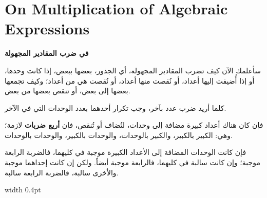 \documentclass[11pt,a4paper,openany,oneside]{book}
\begin{document}
\newpage

\chapter{On Multiplication of Algebraic Expressions}
\label{ch:multiplication}

\noindent\begin{minipage}[t]{0.48\textwidth}
\raggedleft

\begin{Arabic}
\textbf{في ضرب المقادير المجهولة}

سأعلمك الآن كيف تضرب المقادير المجهولة، أي الجذور، بعضها ببعض، إذا كانت وحدها، أو إذا أُضيفت إليها أعداد، أو نُقصت منها أعداد، أو نُقصت هي من أعداد؛ وكيف تجمعها بعضها إلى بعض، أو تنقص بعضها من بعض.

كلما أريد ضرب عدد بآخر، وجب تكرار أحدهما بعدد الوحدات التي في الآخر.

فإن كان هناك أعداد كبيرة مضافة إلى وحدات، لتُضاف أو تُنقص، فإن \textbf{أربع ضربات} لازمة؛ وهي: الكبير بالكبير، والكبير بالوحدات، والوحدات بالكبير، والوحدات بالوحدات.

فإن كانت الوحدات المضافة إلى الأعداد الكبيرة موجبة في كليهما، فالضربة الرابعة موجبة؛ وإن كانت سالبة في كليهما، فالرابعة موجبة أيضاً. ولكن إن كانت إحداهما موجبة والأخرى سالبة، فالضربة الرابعة سالبة.
\end{Arabic}

\end{minipage}%
\hfill\vrule width 0.4pt\hfill
\end{document}
